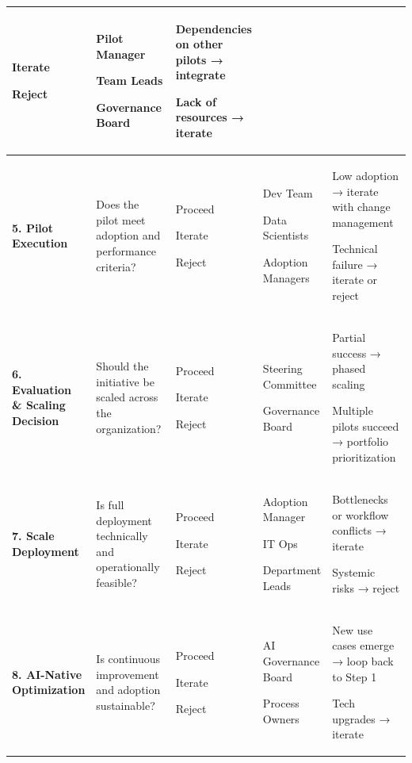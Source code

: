 \documentclass[]{imc-inf}
\begin{document}
\begin{longtable}{|p{0.17\linewidth}|p{0.27\linewidth}|p{0.10\linewidth}|p{0.16\linewidth}|p{0.30\linewidth}|}
	Iterate
	
	Reject &
	Pilot Manager
	
	Team Leads
	
	Governance Board &
	Dependencies on other pilots → integrate
	
	Lack of resources → iterate \\
	\midrule
	
	\textbf{5. Pilot Execution} &
	Does the pilot meet adoption and performance criteria? &
	Proceed
	
	Iterate
	
	Reject &
	Dev Team
	
	Data Scientists
	
	Adoption Managers &
	Low adoption → iterate with change management
	
	Technical failure → iterate or reject \\
	\midrule
	
	\textbf{6. Evaluation \& Scaling Decision} &
	Should the initiative be scaled across the organization? &
	Proceed
	
	Iterate
	
	Reject &
	Steering Committee
	
	Governance Board &
	Partial success → phased scaling
	
	Multiple pilots succeed → portfolio prioritization \\
	\midrule
	
	\textbf{7. Scale Deployment} &
	Is full deployment technically and operationally feasible? &
	Proceed
	
	Iterate
	
	Reject &
	Adoption Manager
	
	IT Ops
	
	Department Leads &
	Bottlenecks or workflow conflicts → iterate
	
	Systemic risks → reject \\
	\midrule
	
	\textbf{8. AI-Native Optimization} &
	Is continuous improvement and adoption sustainable? &
	Proceed
	
	Iterate
	
	Reject &
	AI Governance Board
	
	Process Owners &
	New use cases emerge → loop back to Step 1
	
	Tech upgrades → iterate \\
	
\end{longtable}
\end{document}
